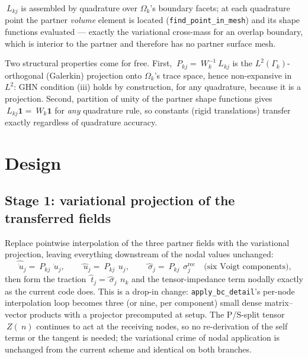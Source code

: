 \documentclass[11pt]{article}
\begin{document}
$~L_{kj}$ is assembled by quadrature over $\Omega_k$'s boundary facets;
at each quadrature point the partner \emph{volume} element is located
(\texttt{find\_point\_in\_mesh}) and its shape functions evaluated ---
exactly the variational cross-mass for an overlap boundary, which is
interior to the partner and therefore has no partner surface mesh.

Two structural properties come for free.  First,
$~P_{kj} = ~W_k^{-1} ~L_{kj}$ is the $L^2(\Gamma_k)$-orthogonal
(Galerkin) projection onto $\Omega_k$'s trace space, hence
non-expansive in $L^2$: GHN condition (iii) holds by construction,
for any quadrature, because it is a projection.  Second, partition of
unity of the partner shape functions gives
$~L_{kj} \mathbf{1} = ~W_k \mathbf{1}$ for \emph{any} quadrature rule,
so constants (rigid translations) transfer exactly regardless of
quadrature accuracy.

\section{Design}

\subsection{Stage 1: variational projection of the transferred fields}

Replace pointwise interpolation of the three partner fields with the
variational projection, leaving everything downstream of the nodal values
unchanged:
\begin{equation}
  \hat{\dot{~u}}_j = ~P_{kj}\, \dot{~u}_j, \qquad
  \hat{~u}_j = ~P_{kj}\, ~u_j, \qquad
  \hat{~\sigma}_j = ~P_{kj}\, ~\sigma_j^{\mathrm{rec}}
  \quad \text{(six Voigt components),}
  \label{eq:stage1}
\end{equation}
then form the traction $\hat{~t}_j = \hat{~\sigma}_j\, ~n_k$ and the
tensor-impedance term nodally exactly as the current code does.  This
is a drop-in change: \texttt{apply\_bc\_detail}'s per-node
interpolation loop becomes three (or nine, per component) small dense
matrix--vector products with a projector precomputed at setup.  The
P/S-split tensor $~Z(~n)$ continues to act at the receiving nodes, so
no re-derivation of the self terms or the tangent is needed; the
variational crime of nodal application is unchanged from the current
scheme and identical on both branches.
\end{document}
